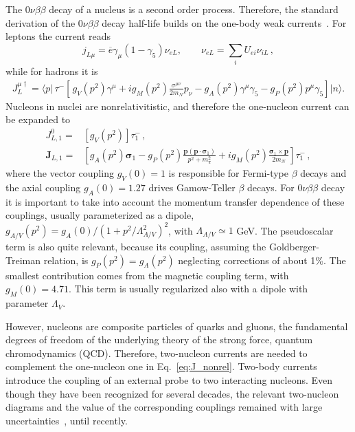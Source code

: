 The $0\nu\beta\beta$ decay of a nucleus is a second order process. Therefore, the standard derivation of the $0\nu\beta\beta$ decay half-life builds on the one-body weak currents~\cite{Doi:1985dx,Tomoda:1990rs,Engel:2016xgb}. For leptons the current reads
\begin{equation}
j_{L\mu}=\overline{e}\gamma_{\mu}\left(1-\gamma_{5}\right)\nu_{eL}, \qquad \nu_{eL}=\sum_{i}U_{ei}\nu_{iL}\,,
\label{eq:j_mu}
\end{equation}
while for hadrons it is
\begin{align}
J_{L}^{\mu\dagger} = \langle  p \rvert\, \tau^{-}
\left[\frac{}{}g_{V}(p^{2})\gamma^{\mu}
+ig_{M}(p^{2})\frac{\sigma^{\mu\nu}}{2m_{N}}p_{\nu}
-g_{A}(p^{2})\gamma^{\mu}\gamma_{5}
-g_{P}(p^{2})p^{\mu}\gamma_{5}
\right] \lvert n \rangle.
\label{eq:J_mu}
\end{align}
Nucleons in nuclei are nonrelativitistic, and therefore the one-nucleon current can be expanded to
\begin{align}
J^0_{L,1}=&\left[g_V(p^2)\right]\tau^-_1\,, \nonumber \\
\bm{J}_{L,1}=&\left[
g_A(p^2) {\bm \sigma}_1
-g_P(p^2)\frac{{\bm p}\left({\bm p}\cdot{\bm \sigma}_1\right)}{p^2+m_{\pi}^2}
+ig_M (p^2)\frac{{\bm \sigma}_1\times{\bm p}}{2m_N}
\right]\tau^-_1\,,
\label{eq:J_nonrel}
\end{align}
where the vector coupling $g_V(0)=1$ is responsible for Fermi-type $\beta$ decays and the axial coupling $g_A(0)=1.27$ drives Gamow-Teller $\beta$ decays. For $0\nu\beta\beta$ decay it is important to take into account the momentum transfer dependence of these couplings, usually parameterized as a dipole, $g_{A/V}(p^2)=g_A(0)/(1+p^2/\Lambda_{A/V}^2)^2$, with $\Lambda_{A/V}\simeq 1$ GeV. The pseudoscalar term is also quite relevant, because its coupling, assuming the Goldberger-Treiman relation, is $g_P(p^2)=g_A(p^2)$ neglecting corrections of about 1\%. The smallest contribution comes from the magnetic coupling term, with $g_M(0)=4.71$. This term is usually regularized also with a dipole with parameter $\Lambda_V$.

However, nucleons are composite particles of quarks and gluons, the fundamental degrees of freedom of the underlying theory of the strong force, quantum chromodynamics (QCD). Therefore, two-nucleon currents are needed to complement the one-nucleon one in Eq.~\eqref{eq:J_nonrel}. Two-body currents introduce the coupling of an external probe to two interacting nucleons. Even though they have been recognized for several decades, the relevant two-nucleon diagrams and the value of the corresponding couplings remained with large uncertainties~\cite{Brown:1987obh,Towner:1987zz}, until recently.


